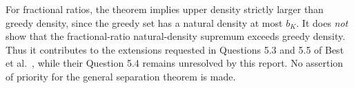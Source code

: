 For fractional ratios, the theorem implies upper density strictly
larger than greedy density, since the greedy set has a natural
density at most $b_K$.  It does \emph{not} show that the fractional-ratio
natural-density supremum exceeds greedy density.  Thus it contributes
to the extensions requested in Questions 5.3 and 5.5 of
Best et al.~\cite{best}, while their Question 5.4 remains unresolved
by this report.  No assertion of priority for the general separation
theorem is made.
